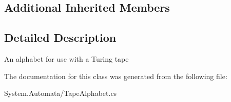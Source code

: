 \subsection*{Additional Inherited Members}


\subsection{Detailed Description}
An alphabet for use with a Turing tape 



The documentation for this class was generated from the following file\+:\begin{DoxyCompactItemize}
\item 
System.\+Automata/Tape\+Alphabet.\+cs\end{DoxyCompactItemize}
